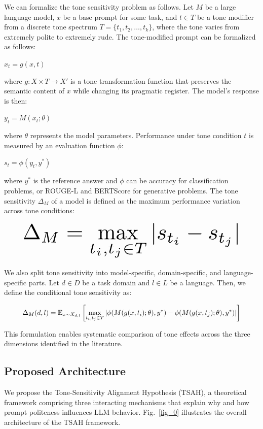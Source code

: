 \documentclass[conference]{IEEEtran}
\begin{document}
We can formalize the tone sensitivity problem as follows. Let $M$ be a large language model, $x$ be a base prompt for some task, and $t \in T$ be a tone modifier from a discrete tone spectrum $T = \{t_1, t_2, \ldots, t_k\}$, where the tone varies from extremely polite to extremely rude. The tone-modified prompt can be formalized as follows:

$x_t = g(x, t)$

where $g: X \times T \rightarrow X'$ is a tone transformation function that preserves the semantic content of $x$ while changing its pragmatic register. The model's response is then:

$y_t = M(x_t; \theta)$

where $\theta$ represents the model parameters. Performance under tone condition $t$ is measured by an evaluation function $\phi$:

$s_t = \phi(y_t, y^*)$

where $y^*$ is the reference answer and $\phi$ can be accuracy for classification problems, or ROUGE-L and BERTScore for generative problems. The tone sensitivity $\Delta_M$ of a model is defined as the maximum performance variation across tone conditions:

\begin{equation}
\resizebox{0.89\columnwidth}{!}{$\displaystyle \Delta_M = \max_{t_i, t_j \in T} |s_{t_i} - s_{t_j}|$}
\end{equation}

We also split tone sensitivity into model-specific, domain-specific, and language-specific parts. Let $d \in D$ be a task domain and $l \in L$ be a language. Then, we define the conditional tone sensitivity as:

\begin{equation}
\resizebox{0.89\columnwidth}{!}{$\displaystyle \Delta_M(d, l) = \mathbb{E}_{x \sim X_{d,l}} \left[ \max_{t_i, t_j \in T} |\phi(M(g(x, t_i); \theta), y^*) - \phi(M(g(x, t_j); \theta), y^*)| \right]$}
\end{equation}

This formulation enables systematic comparison of tone effects across the three dimensions identified in the literature.

\subsection{Proposed Architecture}

We propose the Tone-Sensitivity Alignment Hypothesis (TSAH), a theoretical framework comprising three interacting mechanisms that explain why and how prompt politeness influences LLM behavior. Fig.~\ref{fig_0} illustrates the overall architecture of the TSAH framework.
\end{document}
